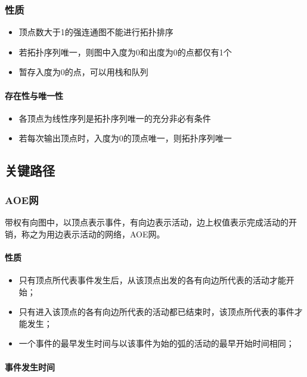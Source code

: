 \subsubsection{性质}

\begin{itemize}
    \item 顶点数大于1的强连通图不能进行拓扑排序
    \item 若拓扑序列唯一，则图中入度为0和出度为0的点都仅有1个
    \item 暂存入度为0的点，可以用栈和队列
\end{itemize}

\paragraph{存在性与唯一性}
\begin{itemize}
    \item 各顶点为线性序列是拓扑序列唯一的充分非必有条件
    \item 若每次输出顶点时，入度为0的顶点唯一，则拓扑序列唯一
\end{itemize}


\subsection{关键路径}

\subsubsection{AOE网}
带权有向图中，以顶点表示事件，有向边表示活动，边上权值表示完成活动的开销，称之为用边表示活动的网络，AOE网。

\paragraph{性质}
\begin{itemize}
    \item 只有顶点所代表事件发生后，从该顶点出发的各有向边所代表的活动才能开始；
    \item 只有进入该顶点的各有向边所代表的活动都已结束时，该顶点所代表的事件才能发生；
    \item 一个事件的最早发生时间与以该事件为始的弧的活动的最早开始时间相同；
\end{itemize}


\paragraph{事件发生时间}

